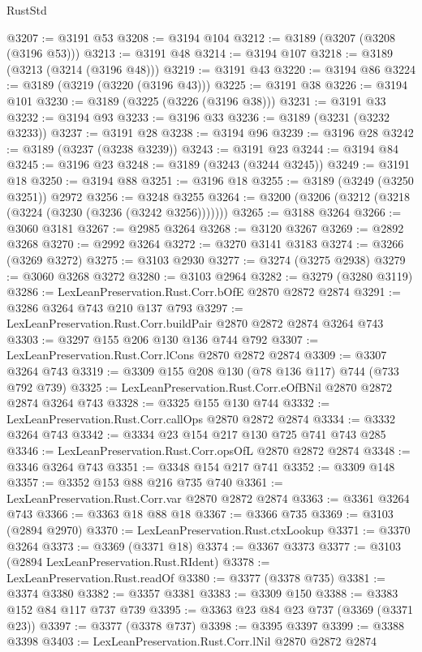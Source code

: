 \begin{lexlean}{RustStd}
\begin{coremodule}
@3207 := @3191 @53
@3208 := @3194 @104
@3212 := @3189 (@3207 (@3208 (@3196 @53)))
@3213 := @3191 @48
@3214 := @3194 @107
@3218 := @3189 (@3213 (@3214 (@3196 @48)))
@3219 := @3191 @43
@3220 := @3194 @86
@3224 := @3189 (@3219 (@3220 (@3196 @43)))
@3225 := @3191 @38
@3226 := @3194 @101
@3230 := @3189 (@3225 (@3226 (@3196 @38)))
@3231 := @3191 @33
@3232 := @3194 @93
@3233 := @3196 @33
@3236 := @3189 (@3231 (@3232 @3233))
@3237 := @3191 @28
@3238 := @3194 @96
@3239 := @3196 @28
@3242 := @3189 (@3237 (@3238 @3239))
@3243 := @3191 @23
@3244 := @3194 @84
@3245 := @3196 @23
@3248 := @3189 (@3243 (@3244 @3245))
@3249 := @3191 @18
@3250 := @3194 @88
@3251 := @3196 @18
@3255 := @3189 (@3249 (@3250 @3251)) @2972
@3256 := @3248 @3255
@3264 := @3200 (@3206 (@3212 (@3218 (@3224 (@3230 (@3236 (@3242 @3256)))))))
@3265 := @3188 @3264
@3266 := @3060 @3181
@3267 := @2985 @3264
@3268 := @3120 @3267
@3269 := @2892 @3268
@3270 := @2992 @3264
@3272 := @3270 @3141 @3183
@3274 := @3266 (@3269 @3272)
@3275 := @3103 @2930
@3277 := @3274 (@3275 @2938)
@3279 := @3060 @3268 @3272
@3280 := @3103 @2964
@3282 := @3279 (@3280 @3119)
@3286 := LexLeanPreservation.Rust.Corr.bOfE @2870 @2872 @2874
@3291 := @3286 @3264 @743 @210 @137 @793
@3297 := LexLeanPreservation.Rust.Corr.buildPair @2870 @2872 @2874 @3264 @743
@3303 := @3297 @155 @206 @130 @136 @744 @792
@3307 := LexLeanPreservation.Rust.Corr.lCons @2870 @2872 @2874
@3309 := @3307 @3264 @743
@3319 := @3309 @155 @208 @130 (@78 @136 @117) @744 (@733 @792 @739)
@3325 := LexLeanPreservation.Rust.Corr.eOfBNil @2870 @2872 @2874 @3264 @743
@3328 := @3325 @155 @130 @744
@3332 := LexLeanPreservation.Rust.Corr.callOps @2870 @2872 @2874
@3334 := @3332 @3264 @743
@3342 := @3334 @23 @154 @217 @130 @725 @741 @743 @285
@3346 := LexLeanPreservation.Rust.Corr.opsOfL @2870 @2872 @2874
@3348 := @3346 @3264 @743
@3351 := @3348 @154 @217 @741
@3352 := @3309 @148
@3357 := @3352 @153 @88 @216 @735 @740
@3361 := LexLeanPreservation.Rust.Corr.var @2870 @2872 @2874
@3363 := @3361 @3264 @743
@3366 := @3363 @18 @88 @18
@3367 := @3366 @735
@3369 := @3103 (@2894 @2970)
@3370 := LexLeanPreservation.Rust.ctxLookup
@3371 := @3370 @3264
@3373 := @3369 (@3371 @18)
@3374 := @3367 @3373
@3377 := @3103 (@2894 LexLeanPreservation.Rust.RIdent)
@3378 := LexLeanPreservation.Rust.readOf
@3380 := @3377 (@3378 @735)
@3381 := @3374 @3380
@3382 := @3357 @3381
@3383 := @3309 @150
@3388 := @3383 @152 @84 @117 @737 @739
@3395 := @3363 @23 @84 @23 @737 (@3369 (@3371 @23))
@3397 := @3377 (@3378 @737)
@3398 := @3395 @3397
@3399 := @3388 @3398
@3403 := LexLeanPreservation.Rust.Corr.lNil @2870 @2872 @2874

\end{coremodule}
\end{lexlean}
